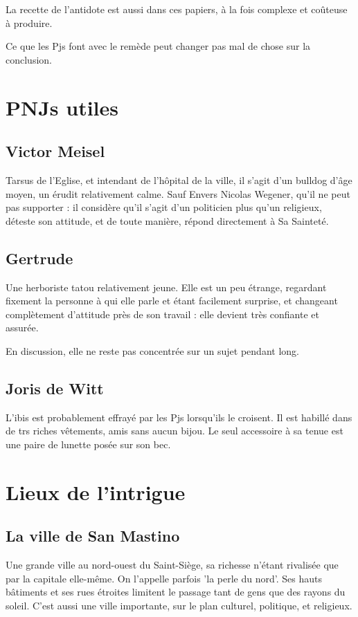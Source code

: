 \documentclass[10pt,a4paper]{article}
\begin{document}
La recette de l'antidote est aussi dans ces papiers, à la fois complexe et coûteuse à produire.

Ce que les Pjs font avec le remède peut changer pas mal de chose sur la conclusion.
\section{PNJs utiles}
\subsection{Victor Meisel}
Tarsus de l'Eglise, et intendant de l'hôpital de la ville, il s'agit d'un bulldog d'âge moyen, un érudit relativement calme. Sauf Envers Nicolas Wegener, qu'il ne peut pas supporter : il considère qu'il s'agit d'un politicien plus qu'un religieux, déteste son attitude, et de toute manière, répond directement à Sa Sainteté.
\subsection{Gertrude}
Une herboriste tatou relativement jeune. Elle est un peu étrange, regardant fixement la personne à qui elle parle et étant facilement surprise, et changeant complètement d'attitude près de son travail : elle devient très confiante et assurée.

En discussion, elle ne reste pas concentrée sur un sujet pendant long.

\subsection{Joris de Witt}
L'ibis est probablement effrayé par les Pjs lorsqu'ils le croisent. Il est habillé dans de trs riches vêtements, amis sans aucun bijou. Le seul accessoire à sa tenue est une paire de lunette posée sur son bec. 
\section{Lieux de l'intrigue}
\subsection{La ville de San Mastino}
Une grande ville au nord-ouest du Saint-Siège, sa richesse n'étant rivalisée que par la capitale elle-même. On l'appelle parfois 'la perle du nord'. Ses hauts bâtiments et ses rues étroites limitent le passage tant de gens que des rayons du soleil. C'est aussi une ville importante, sur le plan culturel, politique, et religieux.
\end{document}
